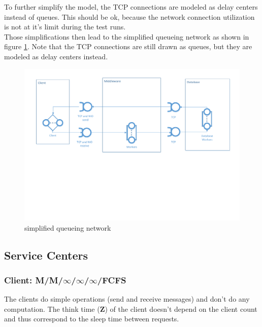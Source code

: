 \documentclass[a4paper]{article}
\begin{document}
\noindent To further simplify the model, the TCP connections are modeled as delay centers instead of queues. This should be ok, because the network connection utilization is not at it's limit during the test runs.\\

\noindent Those simplifications then lead to the simplified queueing network as shown in figure \ref{fig:simplified-queueing-network}. Note that the TCP connections are still drawn as queues, but they are modeled as delay centers instead.\\


\begin{figure}[H]
	\begin{center}
    \includegraphics[scale=0.6, trim = 15mm 94mm 12mm 10mm, clip]{../drawings-ms2le/simplified-queueing-network.pdf}
  \end{center}
  \caption{simplified queueing network}
  \label{fig:simplified-queueing-network}
\end{figure}

\subsection{Service Centers}

\subsubsection{Client: M/M/$\infty$/$\infty$/$\infty$/FCFS}

The clients do simple operations (send and receive messages) and don't do any computation. The think time (\textbf{Z}) of the client doesn't depend on the client count and thus correspond to the sleep time between requests.\\
\end{document}

